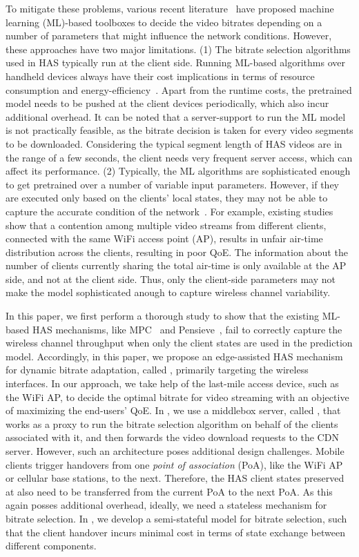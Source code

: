 To mitigate these problems, various recent literature~\cite{} have proposed machine learning (ML)-based toolboxes to decide the video bitrates depending on a number of parameters that might influence the network conditions. However, these approaches have two major limitations. (1) The bitrate selection algorithms used in HAS typically run at the client side. Running ML-based algorithms over handheld devices always have their cost implications in terms of resource consumption and energy-efficiency~\cite{}. Apart from the runtime costs, the pretrained model needs to be pushed at the client devices periodically, which also incur additional overhead. It can be noted that a server-support to run the ML model is not practically feasible, as the bitrate decision is taken for every video segments to be downloaded. Considering the typical segment length of HAS videos are in the range of a few seconds, the client needs very frequent server access, which can affect its performance. (2) Typically, the ML algorithms are sophisticated enough to get pretrained over a number of variable input parameters. However, if they are executed only based on the clients' local states, they may not be able to capture the accurate condition of the network~\cite{}. For example, existing studies~\cite{} show that a contention among multiple video streams from different clients, connected with the same WiFi access point (AP), results in unfair air-time distribution across the clients, resulting in poor QoE. The information about the number of clients currently sharing the total air-time is only available at the AP side, and not at the client side. Thus, only the client-side parameters may not make the model sophisticated anough to capture wireless channel variability. 

In this paper, we first perform a thorough study to show that the existing ML-based HAS mechanisms, like MPC~\cite{} and Pensieve~\cite{}, fail to correctly capture the wireless channel throughput when only the client states are used in the prediction model. Accordingly, in this paper, we propose an edge-assisted HAS mechanism for dynamic bitrate adaptation, called {\bel}, primarily targeting the wireless interfaces. In our approach, we take help of the last-mile access device, such as the WiFi AP, to decide the optimal bitrate for video streaming with an objective of maximizing the end-users' QoE. In {\bel}, we use a middlebox server, called {\servname}, that works as a proxy to run the bitrate selection algorithm on behalf of the clients associated with it, and then forwards the video download requests to the CDN server. However, such an architecture poses additional design challenges. Mobile clients trigger handovers from one \textit{point of association} (PoA), like the WiFi AP or cellular base stations, to the next. Therefore, the HAS client states preserved at {\servname} also need to be transferred from the current PoA to the next PoA. As this again posses additional overhead, ideally, we need a stateless mechanism for bitrate selection. In {\bel}, we develop a semi-stateful model for bitrate selection, such that the client handover incurs minimal cost in terms of state exchange between different {\servname} components. 

